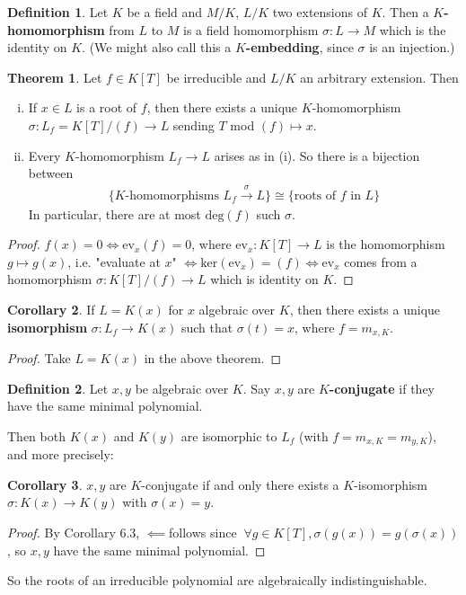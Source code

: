 \documentclass{article}
\theoremstyle{definition}
\newtheorem{theorem}{Theorem}[section]
\newtheorem{cor}[theorem]{Corollary}
\newtheorem{defn}{Definition}[section]
\begin{document}
\begin{defn}
    Let $K$ be a field and $M/K$, $L/K$ two extensions of $K$. Then a \textbf{$K$-homomorphism} from $L$ to $M$ is a field homomorphism $\sigma : L \to M$ which is the identity on $K$. (We might also call this a \textbf{$K$-embedding}, since $\sigma$ is an injection.)
\end{defn}
\begin{theorem}\label{6.2}
    Let $f \in K[T]$ be irreducible and $L/K$ an arbitrary extension. Then
    \begin{enumerate}[(i)]
        \item If $x \in L$ is a root of $f$, then there exists a unique $K$-homomorphism $\sigma : L_f = K[T]/(f) \to L$ sending $T$ mod $(f) \mapsto x$.
        \item Every $K$-homomorphism $L_f \to L$ arises as in (i). So there is a bijection between
        \begin{align*}
            \{K\text{-homomorphisms } L_f \stackrel{\sigma}{\to} L\} \cong \{\text{roots of }f \text{ in }L\}
        \end{align*}
        In particular, there are at most $\text{deg}(f)$ such $\sigma$.
    \end{enumerate}
\end{theorem}
\begin{proof}
    $f(x)=0 \iff \text{ev}_x(f)=0$, where $\text{ev}_x : K[T] \to L$ is the homomorphism $g \mapsto g(x)$, i.e. "evaluate at $x$" $\iff \text{ker}(\text{ev}_x) = (f) \iff \text{ev}_x$ comes from a homomorphism $\sigma : K[T]/(f) \to L$ which is identity on $K$.
\end{proof}
\begin{cor}
    If $L = K(x)$ for $x$ algebraic over $K$, then there exists a unique \textbf{isomorphism} $\sigma : L_f \to K(x)$ such that $\sigma(t)=x$, where $f=m_{x,K}$.
\end{cor}
\begin{proof}
    Take $L = K(x)$ in the above theorem.
\end{proof}
\begin{defn}
    Let $x,y$ be algebraic over $K$. Say $x,y$ are \textbf{$K$-conjugate}  if they have the same minimal polynomial.
\end{defn}
Then both $K(x)$ and $K(y)$ are isomorphic to $L_f$ (with $f=m_{x,K}=m_{y,K}$), and more precisely:
\begin{cor}
    $x,y$ are $K$-conjugate if and only there exists a $K$-isomorphism $\sigma : K(x) \to K(y)$ with $\sigma(x)=y$.
\end{cor}
\begin{proof}
    By Corollary 6.3, $\impliedby $follows since $~\forall  g \in K[T], \sigma(g(x))=g(\sigma(x))$, so $x,y$ have the same minimal polynomial.
\end{proof}
So the roots of an irreducible polynomial are algebraically indistinguishable.
\vspace{1mm}
\end{document}
